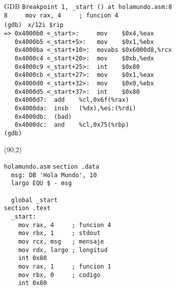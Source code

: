 \documentclass[aspectratio=169]{beamer}
\begin{document}
\begin{frame}[fragile,t]{GDB}
    \vspace{1cm}
    \scriptsize
    \verb|Breakpoint 1, _start () at holamundo.asm:8|\\
    \verb|8	    mov rax, 4     ; funcion 4 |\\
    \vspace{0.1cm}
    \verb|(gdb) | \pause \verb|x/12i $rip|\\
    \pause
    \vspace{0.1cm}
    \verb|=> 0x4000b0 <_start>:     mov    $0x4,%eax|\\
    \verb|   0x4000b5 <_start+5>:   mov    $0x1,%ebx|\\
    \verb|   0x4000ba <_start+10>:  movabs $0x6000d8,%rcx|\\
    \verb|   0x4000c4 <_start+20>:  mov    $0xb,%edx|\\
    \verb|   0x4000c9 <_start+25>:  int    $0x80|\\
    \verb|   0x4000cb <_start+27>:  mov    $0x1,%eax|\\
    \verb|   0x4000d0 <_start+32>:  mov    $0x0,%ebx|\\
    \verb|   0x4000d5 <_start+37>:  int    $0x80|\\
    \verb|   0x4000d7:	add    %cl,0x6f(%rax)|\\
    \verb|   0x4000da:	insb   (%dx),%es:(%rdi)|\\
    \verb|   0x4000db:	(bad)  |\\
    \verb|   0x4000dc:	and    %cl,0x75(%rbp)|\\
    \vspace{0.1cm}
    \verb|(gdb) |\\
    \begin{textblock}{50}(90,2)
    \begin{block}{\small\texttt{holamundo.asm}}
    \verb|section .data                  |\\ 
    \verb|  msg: DB 'Hola Mundo', 10     |\\
    \verb|  largo EQU $ - msg            |\\
    \verb|                               |\\
    \verb|  global _start                |\\
    \verb|section .text                  |\\
    \verb|  _start:                      |\\
    \verb|    mov rax, 4     ; funcion 4 |\\
    \verb|    mov rbx, 1     ; stdout    |\\
    \verb|    mov rcx, msg   ; mensaje   |\\
    \verb|    mov rdx, largo ; longitud  |\\
    \verb|    int 0x80                   |\\
    \verb|    mov rax, 1     ; funcion 1 |\\
    \verb|    mov rbx, 0     ; codigo    |\\
    \verb|    int 0x80                   |
    \end{block}
    \end{textblock}
\end{frame}
\end{document}
